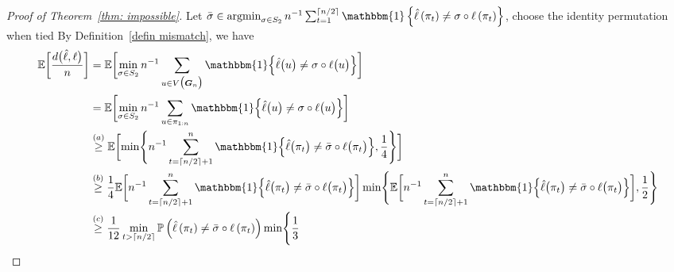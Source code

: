\documentclass[twoside,11pt]{article}
\theoremstyle{remark}
\begin{document}
\begin{proof}[Proof of Theorem~\ref{thm: impossible}]


Let $\bar\sigma\in \operatorname{argmin}_{\sigma \in S_2} n^{-1}\sum_{t=1}^{\lceil n/2\rceil}\mathbbm{1}\left\{\hat{\ell}\left(\pi_t\right)\neq \sigma\circ \ell\left(\pi_t\right)\right\}$, choose the identity permutation when tied
By Definition~\ref{defin mismatch}, we have
%
\begingroup
\begin{equation}
\label{thm impossible: eqn1}
\begin{aligned}
\mathbb{E}\biggl[\frac{d\bigl(\hat{\ell},\ell\bigr)}{n}\biggr]
&=
\mathbb{E}\biggl[
\min_{\sigma \in S_2}
n^{-1}\sum_{u\in V\bigl(\bm{G}_n\bigr)}
\mathbbm{1}\Bigl\{\hat{\ell}\bigl(u\bigr)\neq \sigma\circ \ell\bigl(u\bigr)\Bigr\}
\biggr] \\
&=
\mathbb{E}\biggl[
\min_{\sigma \in S_2}
n^{-1}\sum_{u\in \pi_{1:n}}
\mathbbm{1}\Bigl\{\hat{\ell}\bigl(u\bigr)\neq \sigma\circ \ell\bigl(u\bigr)\Bigr\}
\biggr] \\
&\stackrel{(a)}{\geq}
\mathbb{E}\biggl[
\min\Biggl\{
n^{-1}\sum_{t=\lceil n/2\rceil+1}^n
\mathbbm{1}\Bigl\{\hat{\ell}\bigl(\pi_t\bigr)\neq \bar{\sigma}\circ\ell\bigl(\pi_t\bigr)\Bigr\},
\frac{1}{4}
\Biggr\}
\biggr] \\
&\stackrel{(b)}{\geq}
\frac{1}{4}
\mathbb{E}\biggl[
n^{-1}\sum_{t=\lceil n/2\rceil+1}^n
\mathbbm{1}\Bigl\{\hat{\ell}\bigl(\pi_t\bigr)\neq \bar{\sigma}\circ\ell\bigl(\pi_t\bigr)\Bigr\}
\biggr]
\min\Biggl\{
\mathbb{E}\biggl[
n^{-1}\sum_{t=\lceil n/2\rceil+1}^n
\mathbbm{1}\Bigl\{\hat{\ell}\bigl(\pi_t\bigr)\neq \bar{\sigma}\circ\ell\bigl(\pi_t\bigr)\Bigr\}
\biggr],
\frac{1}{2}
\Biggr\}\\
&\stackrel{(c)}{\geq}
\frac{1}{12}
\min_{t > \lceil n/2 \rceil}\mathbb{P}\left(\hat{\ell}\left(\pi_{t}\right)\neq \bar{\sigma}\circ \ell\left(\pi_{t}\right)\right)
\min\Biggl\{\frac{1}{3}

\end{aligned}
\end{equation}
\end{proof}
\end{document}
